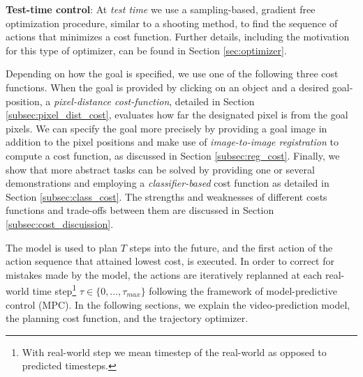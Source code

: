 \noindent \textbf{Test-time control}: At \emph{test time} we use a sampling-based, gradient free optimization procedure, similar to a shooting method,
to find the sequence of actions that minimizes a cost function. Further details, including the motivation for this type of optimizer, can be found in Section \ref{sec:optimizer}. 

Depending on how the goal is specified, we use one of the following three cost functions. When the goal is provided by clicking on an object and a desired goal-position, a \emph{pixel-distance cost-function}, detailed in Section \ref{subsec:pixel_dist_cost}, evaluates how far the designated pixel is from the goal pixels. We can specify the goal more precisely by providing a goal image in addition to the pixel positions and make use of \emph{image-to-image registration} to compute a cost function, as discussed in Section \ref{subsec:reg_cost}. Finally, we show that more abstract
tasks can be solved by providing one or several demonstrations and employing a \emph{classifier-based} cost function as detailed in Section \ref{subsec:class_cost}. The strengths and weaknesses of different costs functions and trade-offs between them are discussed in Section \ref{subsec:cost_discuission}. 

The model is used to plan $T$ steps into the future, and the first action of the action sequence that attained lowest cost, is executed. In order to correct for mistakes made by the model, the actions are iteratively replanned at each real-world time step\footnote{With real-world step we mean timestep of the real-world as opposed to predicted timesteps.} $\tau \in \{0,...,\tau_{max}\}$ following the framework of model-predictive control (MPC). 
In the following sections, we explain the video-prediction model, the planning cost function, and the trajectory optimizer.








